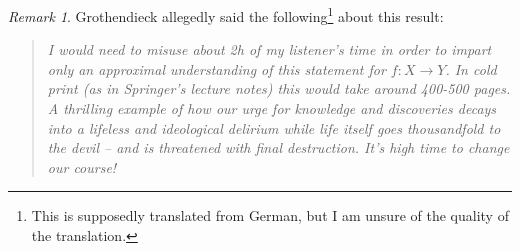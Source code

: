 \documentclass[leqno, openany]{memoir}
\theoremstyle{definition}
\theoremstyle{remark}
\newtheorem{rmk}[thm]{Remark}
\theoremstyle{plain}
\theoremstyle{definition}
\theoremstyle{remark}
\begin{document}
\begin{rmk}
    Grothendieck allegedly said the following\footnote{This is supposedly translated from German, but I am unsure of the quality of the translation.} about this result:
    \begin{quotation}
        \textit{I would need to misuse about 2h of my listener's time in order to impart only an approximal understanding of this statement for $f \colon X \to Y$. In cold print (as in Springer's lecture notes) this would take around 400-500 pages. A thrilling example of how our urge for knowledge and discoveries decays into a lifeless and ideological delirium while life itself goes thousandfold to the devil -- and is threatened with final destruction. It's high time to change our course!} 
    \end{quotation}
\end{rmk}
\end{document}
